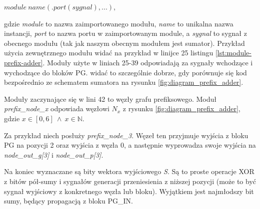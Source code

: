 \documentclass[12pt,oneside,reqno]{article}
\begin{document}
$module\ name(.port(sygnal), ...)$,

\noindent gdzie \textit{module} to nazwa zaimportowanego modułu, \textit{name} to unikalna nazwa instancji, \textit{port} to nazwa portu w zaimportowanym module, a \textit{sygnal} to sygnał z obecnego modułu (tak jak naszym obecnym modułem jest sumator). Przykład użycia zewnętrznego modułu widać na przykład w linijce 25 listingu \ref{lst:module-prefix-adder}.
Moduły  użyte w liniach 25-39 odpowiadają za sygnały wchodzące i wychodzące do bloków PG. widać to szczególnie dobrze, gdy porównuje się kod bezpośrednio ze schematem sumatora na rysunku \ref{fig:diagram_prefix_adder}.

Moduły zaczynające się w lini 42 to węzły grafu prefiksowego. Moduł \textit{prefix\_node\_x} odpowiada węzłowi \textit{$N_x$} z rysunku \ref{fig:diagram_prefix_adder}, gdzie $ x \in [0,6]\ \land\ x \in \mathbb{N} $.


Za przykład niech posłuży \textit{prefix\_node\_3}. Węzeł ten przyjmuje wyjścia z bloku PG na pozycji 2 oraz wyjścia z węzła 0, a następnie wyprowadza swoje wyjścia na \textit{node\_out\_g[3]} i \textit{node\_out\_p[3]}.

Na koniec wyznaczane są bity wektora wyjściowego \textit{S}. Są to proste operacje XOR z bitów pół-sumy i sygnałów generacji przeniesienia z niższej pozycji (może to być sygnał wyjściowy z konkretnego węzła lub bloku). Wyjątkiem jest najmłodszy bit sumy, będący propagacją z bloku PG\_IN.
\end{document}
